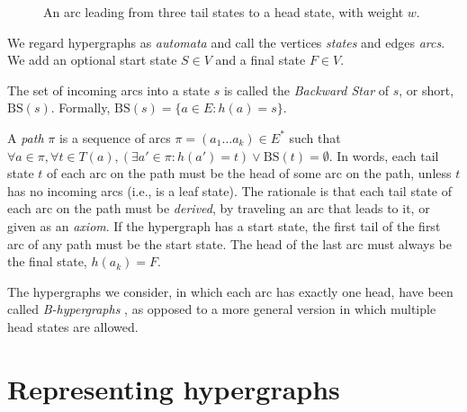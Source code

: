\documentclass[12pt]{article}
\let\cite\citep    %
\begin{document}
\begin{figure}[t]
  \centering
  \caption{An arc leading from three tail states to a head state,
    with weight $w$.}
  \label{fig:hyperarc}
\end{figure}

We regard hypergraphs as \textit{automata} and call the vertices
\textit{states} and edges \textit{arcs}. We add an optional start
state $S\in V$ and a final state $F\in V$.

The set of incoming arcs into a state $s$ is called the
\textit{Backward Star} of $s$, or short, $\mathrm{BS}(s)$. Formally,
$\mathrm{BS}(s) = \{a\in E : h(a) = s\}$.

A \textit{path} $\pi$ is a sequence of arcs $\pi = (a_1 \dots a_k) \in
E^*$ such that $\forall a \in \pi, \forall t \in T(a), (\exists a' \in
\pi : h(a')=t) \lor \mathrm{BS}(t)=\emptyset$. In words, each tail
state $t$ of each arc on the path must be the head of some arc on the
path, unless $t$ has no incoming arcs (i.e., is a leaf state). The
rationale is that each tail state of each arc on the path must be
\textit{derived}, by traveling an arc that leads to it, or given as an
\textit{axiom}.  If the hypergraph has a start state, the first tail
of the first arc of any path must be the start state. The head of the
last arc must always be the final state, $h(a_k)=F$.

The hypergraphs we consider, in which each arc has exactly one head,
have been called \textit{B-hypergraphs} \cite{gallo_directed_1993}, as
opposed to a more general version in which multiple head states are
allowed.

\section{Representing hypergraphs}
\end{document}
